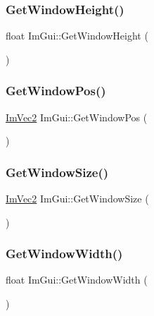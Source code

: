 \subsubsection{\texorpdfstring{Get\+Window\+Height()}{GetWindowHeight()}}
{\footnotesize\ttfamily float Im\+Gui\+::\+Get\+Window\+Height (\begin{DoxyParamCaption}{ }\end{DoxyParamCaption})}

\hypertarget{namespace_im_gui_a413d939f3ef416a47d6e5b48be955146}{}\label{namespace_im_gui_a413d939f3ef416a47d6e5b48be955146} 
\subsubsection{\texorpdfstring{Get\+Window\+Pos()}{GetWindowPos()}}
{\footnotesize\ttfamily \hyperlink{struct_im_vec2}{Im\+Vec2} Im\+Gui\+::\+Get\+Window\+Pos (\begin{DoxyParamCaption}{ }\end{DoxyParamCaption})}

\hypertarget{namespace_im_gui_aaa5c0bfac7125ba9850a08b6db2e90c9}{}\label{namespace_im_gui_aaa5c0bfac7125ba9850a08b6db2e90c9} 
\subsubsection{\texorpdfstring{Get\+Window\+Size()}{GetWindowSize()}}
{\footnotesize\ttfamily \hyperlink{struct_im_vec2}{Im\+Vec2} Im\+Gui\+::\+Get\+Window\+Size (\begin{DoxyParamCaption}{ }\end{DoxyParamCaption})}

\hypertarget{namespace_im_gui_a471ff23945b99541c506dbdc2a9004cf}{}\label{namespace_im_gui_a471ff23945b99541c506dbdc2a9004cf} 
\subsubsection{\texorpdfstring{Get\+Window\+Width()}{GetWindowWidth()}}
{\footnotesize\ttfamily float Im\+Gui\+::\+Get\+Window\+Width (\begin{DoxyParamCaption}{ }\end{DoxyParamCaption})}

